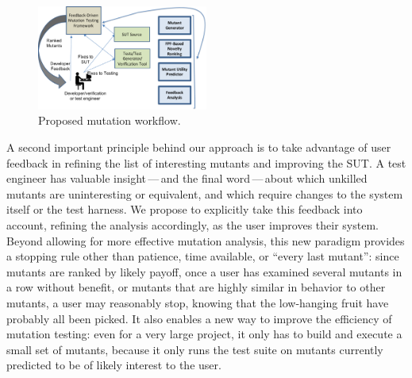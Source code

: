 \begin{figure}
\centering 
\includegraphics[width=0.5\textwidth]{TestFlow}

\caption{Proposed mutation workflow. }
\label{fig:flow}
\end{figure}



A second important principle behind our approach is to take advantage of user
feedback in refining the list of interesting mutants and improving the SUT.
A test engineer has valuable insight\,---\,and the final word\,---\,about which
unkilled mutants are uninteresting or equivalent, and which require changes to
the system itself or the test harness.  We propose to explicitly take this
feedback into account, refining the analysis accordingly, as the user improves
their system.  Beyond allowing for more effective mutation analysis,
this new paradigm provides a stopping rule other than patience, time available, or
``every last mutant'':  since mutants are ranked by likely payoff, once a user
has examined several mutants in a row without benefit, or mutants that are highly
similar in behavior to other mutants, a user may reasonably stop, knowing that
the low-hanging fruit have probably all been picked.
 It also enables a new way to improve the efficiency of
mutation testing:  even for a very large project, it only has to build and
execute a small set of mutants, because it only runs the test suite on mutants
currently predicted to be of likely interest to the user.

